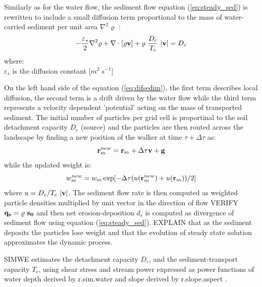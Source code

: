 \documentclass[gmd, manuscript]{copernicus}
\begin{document}
Similarly as for the water flow, the sediment flow equation (\ref{eq:steady_sed}) 
is rewritten to include a small diffusion term proportional to the 
mass of water-carried sediment per unit area $\nabla^2 \varrho$ \citep{Mitas1998}:
\begin{equation}
\label{eq:difsedim}
-{\varepsilon_s \over 2}\nabla^2 \varrho
+ \nabla\cdot [\varrho {\bf v}]
 + \varrho~{D_c \over T_c}~|{\bf v}|
= D_c
\end{equation}
{\small
\noindent
where: \\
\noindent
\hspace*{0.5em} $\varepsilon_s$ is the diffusion constant [$\unit{m^2~s^{-1}}$]\\
}

On the left hand side of the equation (\ref{eq:difsedim}), the first term
describes local diffusion, the second term is a drift driven by the water flow
while the third term represents a velocity dependent 'potential' acting on 
the mass of transported sediment. 
The initial number of particles per grid cell is proportinal to the soil detachment capacity $D_c$
(source) and the particles are then routed across the landscape by finding a new position 
of the walker at time $\tau + \Delta \tau$ as:
\begin{equation}
{\bf r}_m^{new}={\bf r}_m + \Delta \tau {\bf v} + {\bf g}
\end{equation}
 while the updated weight is:
\begin{equation}
w_m^{new}=w_m \exp[- \Delta \tau(u({\bf r}_m^{new})+u({\bf r}_m))/2]
\end{equation}
where $u = {D_c / T_c}~|{\bf v}|$.
The sediment flow rate is then computed as weighted particle densities 
multiplied by unit vector in the direction of flow
VERIFY ${\bf q_s} = \varrho~{\bf s_0}$ and then net erosion-deposition $d_s$ 
is computed as divergence of sediment flow using equation (\ref{eq:steady_sed}).
EXPLAIN that as the sediment deposits the particles lose weight and that the evolution of steady state solution
approximates the dynamic process.

SIMWE estimates the detachment capacity $D_c $, and 
the sediment-transport capacity $T_c $, 
using shear stress and stream power 
expressed as power functions of water depth derived by r.sim.water and slope derived by r.slope.aspect \citep{Mitasova2001}. 
\end{document}
